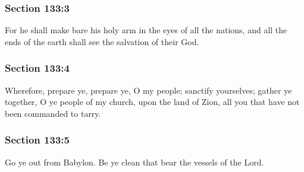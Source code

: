 	\subsubsection{Section 133:3} %
		\label{DC133-3}

		For he shall make bare his holy arm in the eyes of all the nations, and all the ends of the earth shall see the salvation of their God.


	\subsubsection{Section 133:4} %
		\label{DC133-4}

		Wherefore, prepare ye, prepare ye, O my people; sanctify yourselves; gather ye together, O ye people of my church, upon the land of Zion, all you that have not been commanded to tarry.


	\subsubsection{Section 133:5} %
		\label{DC133-5}

		Go ye out from Babylon.  Be ye clean that bear the vessels of the Lord.


